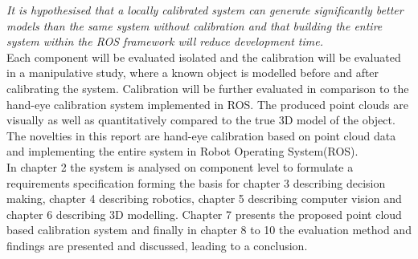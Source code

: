 \textit{It is hypothesised that a locally calibrated system can generate significantly better models than the same system without calibration and that building the entire system within the ROS framework will reduce development time.} \\

Each component will be evaluated isolated and the calibration will be evaluated in a manipulative study, where a known object is modelled before and after calibrating the system. Calibration will be further evaluated in comparison to the hand-eye calibration system implemented in ROS. The produced point clouds are visually as well as quantitatively compared to the true 3D model of the object. The novelties in this report are hand-eye calibration based on point cloud data and implementing the entire system in Robot Operating System(ROS).\\

In chapter 2 the system is analysed on component level to formulate a requirements specification forming the basis for chapter 3 describing decision making, chapter 4 describing robotics, chapter 5 describing computer vision and chapter 6 describing 3D modelling. Chapter 7 presents the proposed point cloud based calibration system and finally in chapter 8 to 10 the evaluation method and findings are presented and discussed, leading to a conclusion.